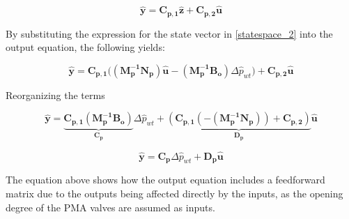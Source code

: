 \begin{equation}
\bm{\hat{y}} = \bm{C_{p,1}} \bm{\hat{z}}  + \bm{C_{p,2}}\bm{\hat{u}}  
 \label{statespace_5}
\end{equation}

By substituting the expression for the state vector in \eqref{statespace_2} into the output equation, the following yields:

\begin{equation}
\bm{\hat{y}} = \bm{C_{p,1}} \big((\bm{M_p^{-1}}\bm{N_p})\bm{\hat{u}} - (\bm{M_p^{-1}}\bm{B_o})\Delta \hat{p}_{wt}\big)  + \bm{C_{p,2}}\bm{\hat{u}}  
 \label{statespace_6}
\end{equation}

Reorganizing the terms

\begin{equation}
\bm{\hat{y}} = \underbrace{\bm{C_{p,1}} (\bm{M_p^{-1}}\bm{B_o})}_\text{$\bm{C_{p}}$} \Delta \hat{p}_{wt} + \underbrace{(\bm{C_{p,1}} (-(\bm{M_p^{-1}}\bm{N_p})) + \bm{C_{p,2}})}_\text{$\bm{D_p}$} \bm{\hat{u}}  
 \label{finaloutput}
\end{equation}


\begin{equation}
  \bm{\hat{y}} = \bm{C_{p}} \Delta \hat{p}_{wt} + \bm{D_p} \bm{\hat{u}} 
  \label{outputfinaleq}
\end{equation}

The equation above shows how the output equation includes a feedforward matrix due to the outputs being affected directly by the inputs, as the opening degree of the PMA valves are assumed as inputs.

